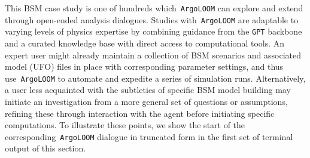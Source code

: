 \documentclass[final,3p,times,sort,compress]{elsarticle}
\newcommand{\AL}{\texttt{ArgoLOOM}\xspace}
\begin{document}
%
This BSM case study is one of hundreds which~\AL can explore and extend through open-ended analysis dialogues.
%
Studies with~\AL are adaptable to varying levels of physics expertise by combining guidance
from the \texttt{GPT} backbone and a curated knowledge base with direct access to computational tools. An expert
user might already maintain a collection of BSM scenarios and associated model (UFO) files in place with corresponding parameter
settings, and thus use~\AL to automate and expedite a series of simulation runs.
%
Alternatively, a user less acquainted with the subtleties of specific BSM model building may initiate an investigation from a more
general set of questions or assumptions, refining these through interaction with the agent before initiating specific computations.
%
To illustrate these points, we show the start of the corresponding~\AL dialogue in truncated form in the first set of
terminal output of this section.
%
\end{document}
